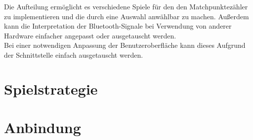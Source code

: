 Die Aufteilung ermöglicht es verschiedene Spiele für den den Matchpunktezähler zu implementieren und die durch eine Auswahl anwählbar zu machen. Außerdem kann die Interpretation der Bluetooth-Signale bei Verwendung von anderer Hardware einfacher angepasst oder ausgetauscht werden.\\
Bei einer notwendigen Anpassung der Benutzeroberfläche kann dieses Aufgrund der Schnittstelle einfach ausgetauscht werden.

\section{Spielstrategie}

\section{Anbindung}